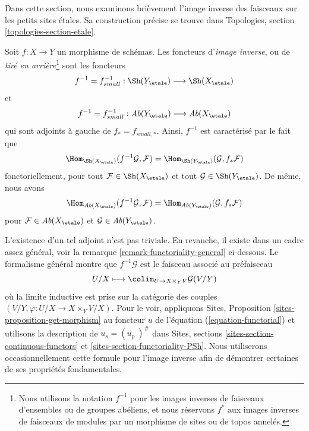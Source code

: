 \noindent
Dans cette section, nous examinons bri\`evement l'image inverse des faisceaux sur les petits
sites \'etales. Sa construction pr\'ecise se trouve dans
Topologies, section \ref{topologies-section-etale}.

\begin{definition}
\label{definition-inverse-image}
Soit $f: X\to Y$ un morphisme de sch\'emas. Les foncteurs d'{\it image inverse}, ou
de {\it tir\'e en arri\`ere}\footnote{Nous utilisons la notation $f^{-1}$ pour les images inverses de
faisceaux d'ensembles ou de groupes ab\'eliens, et nous r\'eservons $f^*$ aux
images inverses de faisceaux de modules par un morphisme de sites ou de topos annel\'es.}
sont les foncteurs
$$
f^{-1} = f_{small}^{-1} :
\Sh(Y_\etale)
\longrightarrow
\Sh(X_\etale)
$$
et
$$
f^{-1} = f_{small}^{-1} :
\textit{Ab}(Y_\etale)
\longrightarrow
\textit{Ab}(X_\etale)
$$
qui sont adjoints \`a gauche de $f_* = f_{small, *}$. Ainsi,
$f^{-1}$ est caract\'eris\'e par le fait que
$$
\Hom_{{\Sh(X_\etale)}} (f^{-1}\mathcal{G}, \mathcal{F})
=
\Hom_{\Sh(Y_\etale)} (\mathcal{G}, f_*\mathcal{F})
$$
fonctoriellement, pour tout $\mathcal{F} \in \Sh(X_\etale)$ et tout
$\mathcal{G} \in \Sh(Y_\etale)$. De m\^eme, nous avons
$$
\Hom_{{\textit{Ab}(X_\etale)}} (f^{-1}\mathcal{G}, \mathcal{F})
=
\Hom_{\textit{Ab}(Y_\etale)} (\mathcal{G}, f_*\mathcal{F})
$$
pour $\mathcal{F} \in \textit{Ab}(X_\etale)$ et
$\mathcal{G} \in \textit{Ab}(Y_\etale)$.
\end{definition}

\noindent
L'existence d'un tel adjoint n'est pas triviale.
En revanche, il existe dans un cadre assez g\'en\'eral, voir la
remarque \ref{remark-functoriality-general}
ci-dessous. Le formalisme g\'en\'eral montre que $f^{-1}\mathcal{G}$
est le faisceau associ\'e au pr\'efaisceau
\begin{equation}
\label{equation-pullback}
U/X
\longmapsto
\colim_{U \to X \times_Y V} \mathcal{G}(V/Y)
\end{equation}
o\`u la limite inductive est prise sur la cat\'egorie des couples
$(V/Y, \varphi : U/X \to X \times_Y V/X)$.
Pour le voir, appliquons
Sites, Proposition \ref{sites-proposition-get-morphism}
au foncteur $u$ de l'\'equation (\ref{equation-functorial})
et utilisons la description de $u_s = (u_p\ )^\#$ dans
Sites, sections \ref{sites-section-continuous-functors} et
\ref{sites-section-functoriality-PSh}.
Nous utiliserons occasionnellement cette formule pour l'image inverse
afin de d\'emontrer certaines de ses propri\'et\'es fondamentales.


